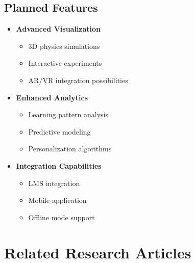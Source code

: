 \subsection{Planned Features}
\begin{itemize}
    \item \textbf{Advanced Visualization}
        \begin{itemize}
            \item 3D physics simulations
            \item Interactive experiments
            \item AR/VR integration possibilities
        \end{itemize}
    
    \item \textbf{Enhanced Analytics}
        \begin{itemize}
            \item Learning pattern analysis
            \item Predictive modeling
            \item Personalization algorithms
        \end{itemize}
    
    \item \textbf{Integration Capabilities}
        \begin{itemize}
            \item LMS integration
            \item Mobile application
            \item Offline mode support
        \end{itemize}
\end{itemize}

\section{Related Research Articles}
\label{sec:related-research}


